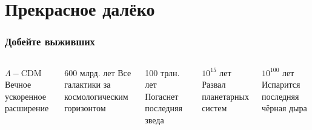 \documentclass[aspectratio=169]{beamer}
\begin{document}
\section{Прекрасное далёко}
\begin{frame}
\frametitle{Добейте выживших}
\begin{columns}[c]
\begin{block}{$\Lambda-\mathrm{CDM}$}
Вечное ускоренное расширение
\end{block}
\begin{block}{600 млрд. лет}
Все галактики за космологическим горизонтом
\end{block}
\begin{block}{100 трлн. лет}
Погаснет последняя зведа
\end{block}
\begin{block}{$10^{15}$ лет}
Развал планетарных систем
\end{block}
\begin{block}{$10^{100}$ лет}
Испарится последняя чёрная дыра
\end{block}
\vfill
\end{columns}
\end{frame}
\end{document}
